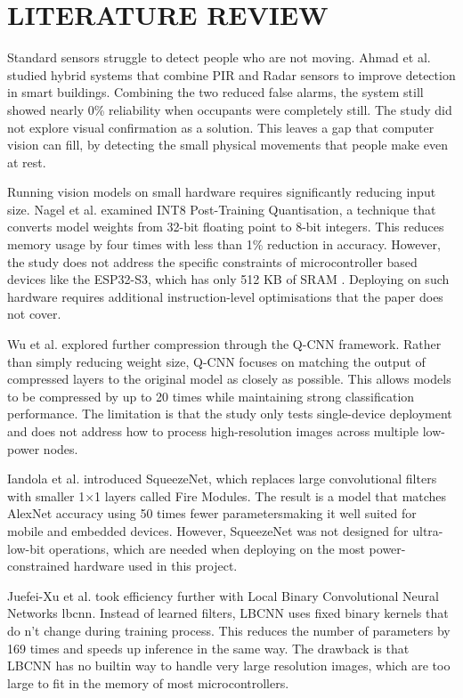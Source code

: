\chapter{LITERATURE REVIEW}
Standard sensors struggle to detect people who are not moving. Ahmad et al. \cite{Ahmad2021}  studied hybrid systems that combine PIR and Radar sensors to improve detection in smart buildings. Combining the two reduced false alarms, the system still showed nearly 0\% reliability when occupants were completely still. The study did not explore visual confirmation as a solution. This leaves a gap that computer vision can fill, by detecting the small physical movements that people make even at rest.

Running vision models on small hardware requires significantly reducing input size. Nagel et al. \cite{nagel2021white} examined INT8 Post-Training Quantisation, a technique that converts model weights from 32-bit floating point to 8-bit integers. This reduces memory usage by four times with less than 1\% reduction in accuracy. However, the study does not address the specific constraints of microcontroller based devices like the ESP32-S3, which has only 512 KB of SRAM \cite{esp32s3_datasheet} . Deploying on such hardware requires additional instruction-level optimisations that the paper does not cover.

Wu et al. \cite{wu2016qcnn} explored further compression through the Q-CNN framework. Rather than simply reducing weight size, Q-CNN focuses on matching the output of compressed layers to the original model as closely as possible. This allows models to be compressed by up to 20 times while maintaining strong classification performance. The limitation is that the study only tests single-device deployment and does not address how to process high-resolution images across multiple low-power nodes.

Iandola et al. \cite{iandola2016squeezenet} introduced SqueezeNet, which replaces large convolutional filters with smaller 1×1 layers called Fire Modules. The result is a model that matches AlexNet accuracy using 50 times fewer parametersmaking it well suited for mobile and embedded devices. However, SqueezeNet was not designed for ultra-low-bit operations, which are needed when deploying on the most power-constrained hardware used in this project.

Juefei-Xu et al. \cite{juefei2017lbcnn} took efficiency further with Local Binary Convolutional Neural Networks \gls{lbcnn}. Instead of learned filters, LBCNN uses fixed binary kernels that do n’t change during training process. This reduces the number of parameters by 169 times and speeds up inference in the same way. The drawback is that LBCNN has no builtin way to handle very large resolution images, which are too large to fit in the memory of most microcontrollers.

